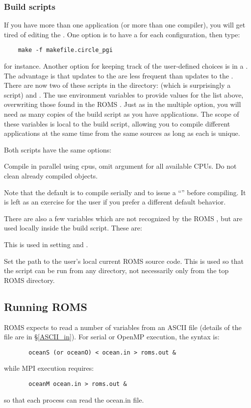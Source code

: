 \subsubsection{Build scripts}

If you have more than one application (or more than one compiler),
you will get tired of editing the .
One option is to have a  for each configuration, then
type:
\begin{verbatim}
    make -f makefile.circle_pgi
\end{verbatim}
for instance. Another option for keeping track of the user-defined
choices is in a . The advantage is that updates
to the  are less frequent than updates to the
. There are now two of these scripts in the 
directory:  (which is surprisingly a  script)
and .  The  use environment variables
to provide values for the list above, overwriting those found in the ROMS
. Just as in the multiple  option, you will
need as many copies of the build script as you have applications. The
scope of these variables is local to the build script, allowing you to
compile different applications at the same time from the same sources
as long as each  is unique.

Both scripts have the same options:
\begin{klist}
   Compile in parallel using  cpus,
  omit argument for all available CPUs.
      Do not clean already compiled objects.
\end{klist}
Note that the default is to compile serially and to issue a
``'' before compiling. It is left as an exercise
for the user if you prefer a different default behavior.

There are also a few variables which are not recognized by the ROMS
, but are used locally inside the build script. These
are:
\begin{klist}
 This is used in setting
 and .

 Set the path to the user's local current ROMS source
code. This is used so that the script can be run from any directory,
not necessarily only from the top ROMS directory.
\end{klist}

\subsection{Running ROMS}
\label{Running}
ROMS expects to read a number of variables from an ASCII file
(details of the file are in \S\ref{ASCII_in}).
For serial or OpenMP execution, the syntax is:
\begin{verbatim}
       oceanS (or oceanO) < ocean.in > roms.out &
\end{verbatim}
while MPI execution requires:
\begin{verbatim}
       oceanM ocean.in > roms.out &
\end{verbatim}
so that each process can read the ocean.in file.

